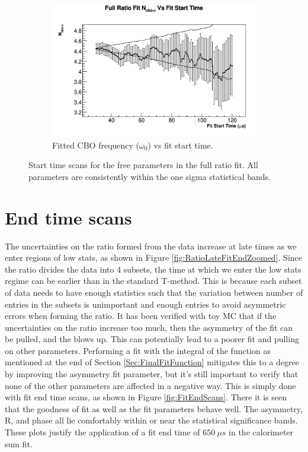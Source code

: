 \begin{figure}[]
\begin{subfigure}[t]{0.45\textwidth}
			\includegraphics[width=\textwidth]{RatioCBO_N_cbo-phi_FS_Canv}
		    \caption{Fitted CBO frequency ($\omega_{0}$) vs fit start time.}
	    \end{subfigure}%
	\caption[FitStartScans]{Start time scans for the free parameters in the full ratio fit. All parameters are consistently within the one sigma statistical bands.}
	\label{fig:FitStartScans}
	\end{figure}

\clearpage

\section{End time scans}

	The uncertainties on the ratio formed from the data increase at late times as we enter regions of low stats, as shown in Figure \ref{fig:RatioLateFitEndZoomed}.  Since the ratio divides the data into 4 subsets, the time at which we enter the low stats regime can be earlier than in the standard T-method.  This is because each subset of data needs to have enough statistics such that the variation between number of entries in the subsets is unimportant and enough entries to avoid asymmetric errors when forming the ratio. It has been verified with toy MC that if the uncertainties on the ratio increase too much, then the asymmetry of the fit can be pulled, and the \chisq blows up. This can potentially lead to a poorer fit and pulling on other parameters. Performing a fit with the integral of the function as mentioned at the end of Section \ref{Sec:FinalFitFunction} mitigates this to a degree by improving the asymmetry fit parameter, but it’s still important to verify that none of the other parameters are affected in a negative way. This is simply done with fit end time scans, as shown in Figure \ref{fig:FitEndScans}. There it is seen that the goodness of fit as well as the fit parameters behave well. The asymmetry, R, and \gmtwo phase all lie comfortably within or near the statistical significance bands. These plots justify the application of a fit end time of $\SI{650}{\mu s}$ in the calorimeter sum fit.

